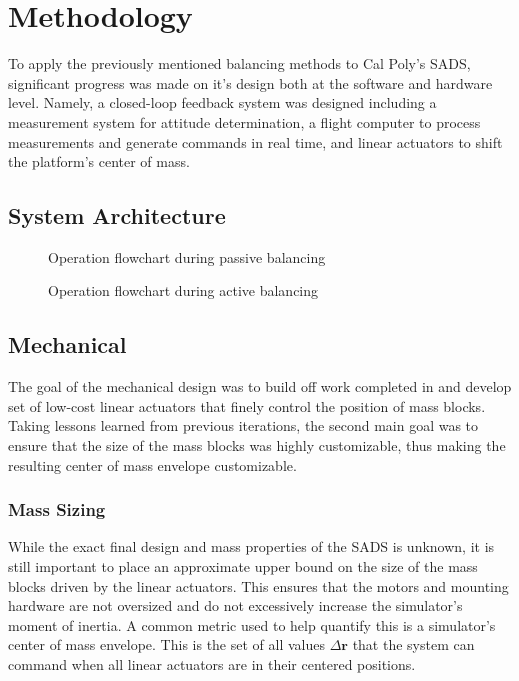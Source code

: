 \chapter{Methodology}

To apply the previously mentioned balancing methods to Cal Poly's SADS, significant progress was made on it's design both at the software and hardware level. Namely, a closed-loop feedback system was designed including a measurement system for attitude determination, a flight computer to process measurements and generate commands in real time, and linear actuators to shift the platform's center of mass.

\section{System Architecture}

\begin{figure}
    \centering
    
    \caption{Operation flowchart during passive balancing}
    \label{fig:sys_arch_passive}
\end{figure}

\begin{figure}
    \centering
    
    \caption{Operation flowchart during active balancing}
    \label{fig:sys_arch_active}
\end{figure}


\section{Mechanical}

The goal of the mechanical design was to build off work completed in \cite{gilman_automatic_2024} and develop set of low-cost linear actuators that finely control the position of mass blocks. Taking lessons learned from previous iterations, the second main goal was to ensure that the size of the mass blocks was highly customizable, thus making the resulting center of mass envelope customizable. 

\subsection{Mass Sizing}

While the exact final design and mass properties of the SADS is unknown, it is still important to place an approximate upper bound on the size of the mass blocks driven by the linear actuators. This ensures that the motors and mounting hardware are not oversized and do not excessively increase the simulator's moment of inertia. A common metric used to help quantify this is a simulator's center of mass envelope. This is the set of all values $\Delta\mathbf{r}$ that the system can command when all linear actuators are in their centered positions.

